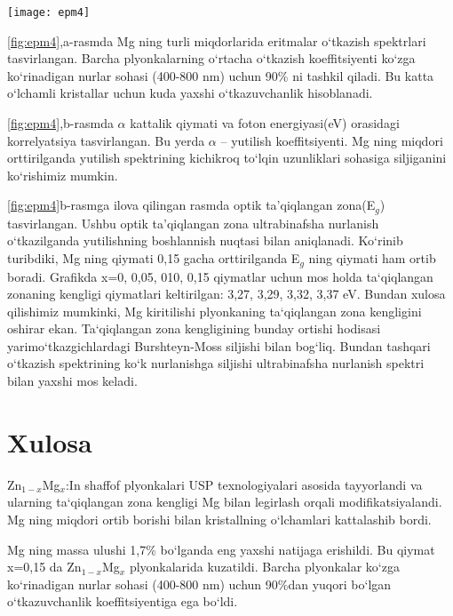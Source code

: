 \documentclass[14pt]{article}
\begin{document}
\begin{figure*}[h]
	\centering
	\texttt{[image: epm4]}
	\caption{Mg ning turli konsentratsiyalarida yupqa plyonkalarning o`tkazish spektri(a) va $\alpha$ qiymat va foto energiya orasidagi korrelyatsiya}
	\label{fig:epm4}
\end{figure*}
	\ref{fig:epm4},a-rasmda Mg ning turli miqdorlarida eritmalar o`tkazish spektrlari tasvirlangan. Barcha plyonkalarning o`rtacha o`tkazish koeffitsiyenti ko`zga ko`rinadigan nurlar sohasi (400-800 nm) uchun 90\% ni tashkil qiladi. Bu katta o`lchamli kristallar uchun kuda yaxshi o`tkazuvchanlik hisoblanadi.
	
\ref{fig:epm4},b-rasmda $\alpha$ kattalik qiymati va foton energiyasi(eV) orasidagi korrelyatsiya tasvirlangan. Bu yerda $\alpha$ -- yutilish koeffitsiyenti. Mg ning miqdori orttirilganda yutilish spektrining kichikroq to`lqin uzunliklari sohasiga siljiganini ko`rishimiz mumkin.  

\ref{fig:epm4}b-rasmga ilova qilingan rasmda optik ta'qiqlangan zona(E$_{g}$) tasvirlangan. Ushbu optik ta'qiqlangan zona ultrabinafsha nurlanish o`tkazilganda yutilishning boshlannish nuqtasi bilan aniqlanadi. Ko`rinib turibdiki, Mg ning qiymati 0,15 gacha orttirilganda E$_{g}$ ning qiymati ham ortib boradi. Grafikda x=0, 0,05, 010, 0,15 qiymatlar uchun mos holda ta`qiqlangan zonaning kengligi qiymatlari keltirilgan: 3,27, 3,29, 3,32, 3,37 eV. Bundan xulosa qilishimiz mumkinki, Mg kiritilishi plyonkaning ta`qiqlangan zona kengligini oshirar ekan. Ta`qiqlangan zona kengligining bunday ortishi hodisasi yarimo`tkazgichlardagi  Burshteyn-Moss siljishi bilan bog`liq. Bundan tashqari o`tkazish spektrining ko`k nurlanishga siljishi ultrabinafsha nurlanish spektri bilan yaxshi mos keladi. 
	
\newpage
{}
\section*{Xulosa}
	\noindent	
	Zn$_{1-x}$Mg$_{x}$:In shaffof plyonkalari USP texnologiyalari asosida tayyorlandi va ularning ta`qiqlangan zona kengligi Mg bilan legirlash orqali modifikatsiyalandi. Mg ning miqdori ortib borishi bilan kristallning o`lchamlari kattalashib bordi.
	
	Mg ning massa ulushi 1,7\% bo`lganda eng yaxshi natijaga erishildi. Bu qiymat x=0,15 da Zn$_{1-x}$Mg$_{x}$ plyonkalarida kuzatildi. Barcha plyonkalar ko`zga ko`rinadigan nurlar sohasi (400-800 nm) uchun 90\%dan yuqori bo`lgan o`tkazuvchanlik koeffitsiyentiga ega bo`ldi.
	
\end{document}
